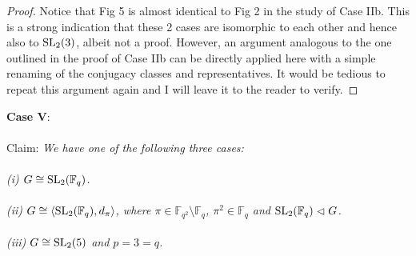 \begin{proof}






Notice that Fig 5 is almost identical to Fig 2 in the study of Case IIb. This is a strong indication that these 2 cases are isomorphic to each other and hence also to $\operatorname{SL}_2(3)$, albeit not a proof. However, an argument analogous to the one outlined in the proof of Case IIb can be directly applied here with a simple renaming of the conjugacy classes and representatives. It would be tedious to repeat this argument again and I will leave it to the reader to verify.

\end{proof}

\textbf{Case V}:\\
\\
Claim: \textit{We have one of the following three cases: \\
\\
(i) $G \cong \operatorname{SL}_2(\mathbb{F}_q)$. \\
\\
(ii) $G \cong \langle \operatorname{SL}_2(\mathbb{F}_q), d_\pi \rangle$, where $\pi \in \mathbb{F}_{q^2} \setminus \mathbb{F}_q$, $\pi^2 \in \mathbb{F}_q$ and $\operatorname{SL}_2(\mathbb{F}_q) \vartriangleleft G$. \\
\\
(iii) $G \cong \operatorname{SL}_2(5)$ and $p=3=q$.}


